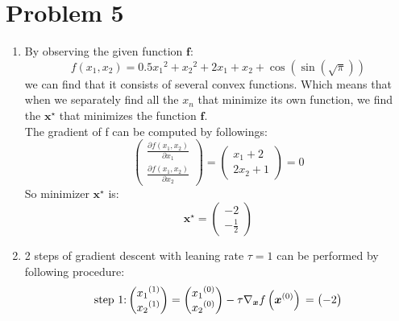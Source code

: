 \documentclass[12pt]{scrartcl}
\newcommand{\vect}[1]{\boldsymbol{#1}}
\newcommand{\ve}{\vect}
\begin{document}
    \section*{Problem 5}
\begin{enumerate}[label=\alph*)]
\item 
By observing the given function $\ve{f}$: 
\[f(x_1, x_2) = 0.5{x_1}^2 + {x_2}^2 + 2x_1 + x_2 + \cos(\sin (\sqrt{\pi}))\]
we can find that it consists of several convex functions. Which means that when we separately find all the $x_n$ that minimize its own function, we find the $\ve{x}^\star$ that minimizes the function $\ve{f}$.
\\
The gradient of f can be computed by followings:
\begin{equation*}
    \begin{pmatrix}
        \displaystyle\frac{\partial{f(x_1, x_2)}}{\partial{x_1}}\\
        \displaystyle\frac{\partial{f(x_1, x_2)}}{\partial{x_2}}
    \end{pmatrix}
     =
    \begin{pmatrix}
        \displaystyle x_1 + 2 \\
        \displaystyle 2x_2 + 1
    \end{pmatrix}
     =0
\end{equation*}
So minimizer $\ve{x}^\star$ is:
\begin{equation*}
\ve{x}^\star =
\begin{pmatrix}
         -2 \\
        \displaystyle -\frac{1}{2} 
    \end{pmatrix}
\end{equation*}
\item
2 steps of gradient descent with leaning rate $\tau = 1$ can be performed by following procedure:
\begin{equation*}
\text{step 1:} 
    \begin{pmatrix}
        \displaystyle x{_1}^{(1)} \\
        \displaystyle x{_2}^{(1)}
    \end{pmatrix}
    =
    \begin{pmatrix}
        \displaystyle x{_1}^{(0)} \\
        \displaystyle x{_2}^{(0)}
    \end{pmatrix}
    -\tau \nabla_{\ve{x}} f\left(\ve{x}^{(0)}\right) \\
    =
    \begin{pmatrix}
        -2 \\

\end{pmatrix}
\end{equation*}
\end{enumerate}
\end{document}

